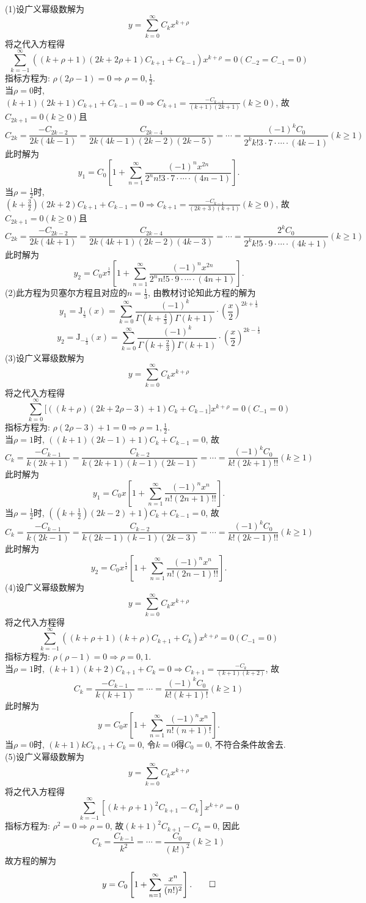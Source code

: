 \documentclass[titlepage,11pt,a4paper,twoside]{report}
\makeatletter
\newenvironment{solve}{\par
	\pushQED{\qed}%
	\normalfont \topsep1\p@\@plus6\p@\relax
	\trivlist
	\item\relax
	{\hspace*{\parindent}{\heiti 解}\@addpunct{:}}\hspace\labelsep\ignorespaces
}{%
	\popQED\endtrivlist\@endpefalse
}
\makeatother
\begin{document}
\begin{solve}
(1)设广义幂级数解为
\[y=\sum_{k=0}^{\infty}C_kx^{k+\rho}\]
将之代入方程得
\[\sum_{k=-1}^{\infty}\left((k+\rho+1)(2k+2\rho+1)C_{k+1}+C_{k-1}\right)x^{k+\rho}=0(C_{-2}=C_{-1}=0)\]
指标方程为: $\rho(2\rho-1)=0\Rightarrow\rho=0,\frac{1}{2}$.\\
当$\rho=0$时, $(k+1)(2k+1)C_{k+1}+C_{k-1}=0\Rightarrow C_{k+1}=\frac{-C_{k-1}}{(k+1)(2k+1)}(k\geq0)$, 故$C_{2k+1}=0(k\geq0)$且
\[C_{2k}=\frac{-C_{2k-2}}{2k(4k-1)}=\frac{C_{2k-4}}{2k(4k-1)(2k-2)(2k-5)}=\cdots=\frac{(-1)^kC_0}{2^kk!3\cdot7\cdot\cdots\cdot(4k-1)}(k\geq1)\]
此时解为
\[y_1=C_0\left[1+\sum_{n=1}^{\infty}\frac{(-1)^nx^{2n}}{2^nn!3\cdot7\cdot\cdots\cdot(4n-1)}\right].\]
当$\rho=\frac{1}{2}$时, $(k+\frac{3}{2})(2k+2)C_{k+1}+C_{k-1}=0\Rightarrow C_{k+1}=\frac{-C_{k-1}}{(2k+3)(k+1)}(k\geq0)$, 故$C_{2k+1}=0(k\geq0)$且
\[C_{2k}=\frac{-C_{2k-2}}{2k(4k+1)}=\frac{C_{2k-4}}{2k(4k+1)(2k-2)(4k-3)}=\cdots=\frac{2^kC_0}{2^kk!5\cdot9\cdot\cdots\cdot(4k+1)}(k\geq1)\]
此时解为
\[y_2=C_0x^{\frac{1}{2}}\left[1+\sum_{n=1}^{\infty}\frac{(-1)^nx^{2n}}{2^nn!5\cdot9\cdot\cdots\cdot(4n+1)}\right].\]
(2)此方程为贝塞尔方程且对应的$n=\frac{1}{3}$, 由教材讨论知此方程的解为
\[y_1=\mathrm{J}_{\frac{1}{3}}(x)=\sum_{k=0}^{\infty}\frac{(-1)^k}{\Gamma\left(k+\frac{4}{3}\right)\Gamma(k+1)}\cdot\left(\frac{x}{2}\right)^{2k+\frac{1}{3}}\]
\[y_2=\mathrm{J}_{-\frac{1}{3}}(x)=\sum_{k=0}^{\infty}\frac{(-1)^k}{\Gamma\left(k+\frac{2}{3}\right)\Gamma(k+1)}\cdot\left(\frac{x}{2}\right)^{2k-\frac{1}{3}}\]
(3)设广义幂级数解为
\[y=\sum_{k=0}^{\infty}C_kx^{k+\rho}\]
将之代入方程得
\[\sum_{k=0}^{\infty}\big[((k+\rho)(2k+2\rho-3)+1)C_k+C_{k-1}\big]x^{k+\rho}=0(C_{-1}=0)\]
指标方程为: $\rho(2\rho-3)+1=0\Rightarrow\rho=1,\frac{1}{2}$.\\
当$\rho=1$时, $((k+1)(2k-1)+1)C_k+C_{k-1}=0$, 故
\[C_k=\frac{-C_{k-1}}{k(2k+1)}=\frac{C_{k-2}}{k(2k+1)(k-1)(2k-1)}=\cdots=\frac{(-1)^kC_0}{k!(2k+1)!!}(k\geq1)\]
此时解为
\[y_1=C_0x\left[1+\sum_{n=1}^{\infty}\frac{(-1)^nx^n}{n!(2n+1)!!}\right].\]
当$\rho=\frac{1}{2}$时, $((k+\frac{1}{2})(2k-2)+1)C_k+C_{k-1}=0$, 故
\[C_k=\frac{-C_{k-1}}{k(2k-1)}=\frac{C_{k-2}}{k(2k-1)(k-1)(2k-3)}=\cdots=\frac{(-1)^kC_0}{k!(2k-1)!!}(k\geq1)\]
此时解为
\[y_2=C_0x^{\frac{1}{2}}\left[1+\sum_{n=1}^{\infty}\frac{(-1)^nx^n}{n!(2n-1)!!}\right].\]
(4)设广义幂级数解为
\[y=\sum_{k=0}^{\infty}C_kx^{k+\rho}\]
将之代入方程得
\[\sum_{k=-1}^{\infty}((k+\rho+1)(k+\rho)C_{k+1}+C_k)x^{k+\rho}=0(C_{-1}=0)\]
指标方程为: $\rho(\rho-1)=0\Rightarrow\rho=0,1$.\\
当$\rho=1$时, $(k+1)(k+2)C_{k+1}+C_k=0\Rightarrow C_{k+1}=\frac{-C_k}{(k+1)(k+2)}$, 故
\[C_k=\frac{-C_{k-1}}{k(k+1)}=\cdots=\frac{(-1)^kC_0}{k!(k+1)!}(k\geq1)\]
此时解为
\[y=C_0x\left[1+\sum_{n=1}^{\infty}\frac{(-1)^nx^n}{n!(n+1)!}\right].\]
当$\rho=0$时, $(k+1)kC_{k+1}+C_k=0$, 令$k=0$得$C_0=0$, 不符合条件故舍去.\\
(5)设广义幂级数解为
\[y=\sum_{k=0}^{\infty}C_kx^{k+\rho}\]
将之代入方程得
\[\sum_{k=-1}^{\infty}\left[(k+\rho+1)^2C_{k+1}-C_k\right]x^{k+\rho}=0\]
指标方程为: $\rho^2=0\Rightarrow\rho=0$, 故$(k+1)^2C_{k+1}-C_k=0$, 因此
\[C_k=\frac{C_{k-1}}{k^2}=\cdots=\frac{C_0}{(k!)^2}(k\geq1)\]
故方程的解为
\[y=C_0\left[1+\sum_{n=1}^{\infty}\frac{x^n}{(n!)^2}\right].\qedhere\]
\end{solve}
\end{document}
